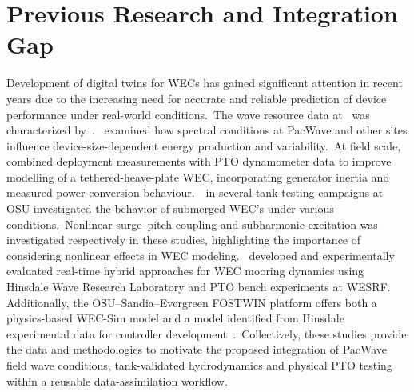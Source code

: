 \documentclass[11pt]{article}
\begin{document}
\section{Previous Research and Integration Gap}
Development of digital twins for WECs has gained significant attention in recent years due to the increasing need for accurate and reliable prediction of device performance under real-world conditions.~The wave resource data at~\cite{pacwave2026} was characterized by~\cite{Dunkle2020PacWave}.~\cite{Robertson2022WECSize} examined how spectral conditions at PacWave and other sites influence device-size-dependent energy production and variability.~At field scale,~\cite{O} combined deployment measurements with PTO dynamometer data to improve modelling of a tethered-heave-plate WEC, incorporating generator inertia and measured power-conversion behaviour.~\cite{Ali2025SurgePitch, ali_subharmonic_2026}~in several tank-testing campaigns at OSU investigated the behavior of submerged-WEC's under various conditions.~Nonlinear surge–pitch coupling and subharmonic excitation was investigated respectively in these studies, highlighting the importance of considering nonlinear effects in WEC modeling.~\cite{McConnell2025HybridMooring,McConnell2026HybridFramework} developed and experimentally evaluated real-time hybrid approaches for WEC mooring dynamics using Hinsdale Wave Research Laboratory and PTO bench experiments at WESRF. Additionally, the OSU–Sandia–Evergreen FOSTWIN platform offers both a physics-based WEC-Sim model and a model identified from Hinsdale experimental data for controller development~\cite{FOSTWINDigitalTwin}.~Collectively, these studies provide the data and methodologies to motivate the proposed integration of PacWave field wave conditions, tank-validated hydrodynamics and physical PTO testing within a reusable data-assimilation workflow.
\end{document}
